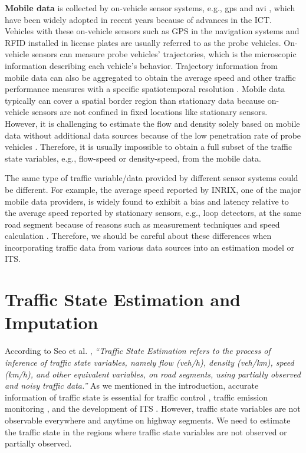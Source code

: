 \documentclass[english]{kththesis}
\begin{document}
\textbf{Mobile data} is collected by on-vehicle sensor systems, e.g., \gls{gps} and \gls{avi} \cite{seo_tse, tsanakas_emission_estimation, herrera_gps_mobile_century}, which have been widely adopted in recent years because of advances in the ICT. Vehicles with these on-vehicle sensors such as GPS in the navigation systems and RFID installed in license plates are usually referred to as the probe vehicles. On-vehicle sensors can measure probe vehicles' trajectories, which is the microscopic information describing each vehicle's behavior. Trajectory information from mobile data can also be aggregated to obtain the average speed and other traffic performance measures with a specific spatiotemporal resolution \cite{seo_tse, sharma_inrix_data_opportunity}. Mobile data typically can cover a spatial border region than stationary data because on-vehicle sensors are not confined in fixed locations like stationary sensors. However, it is challenging to estimate the flow and density solely based on mobile data without additional data sources because of the low penetration rate of probe vehicles \cite{tsanakas_emission_estimation}. Therefore, it is usually impossible to obtain a full subset of the traffic state variables, e.g., flow-speed or density-speed, from the mobile data. 

The same type of traffic variable/data provided by different sensor systems could be different. For example, the average speed reported by INRIX, one of the major mobile data providers, is widely found to exhibit a bias and latency relative to the average speed reported by stationary sensors, e.g., loop detectors, at the same road segment because of reasons such as measurement techniques and speed calculation \cite{sharma_inrix_data_opportunity, kim_inrix_data_comparing}. Therefore, we should be careful about these differences when incorporating traffic data from various data sources into an estimation model or ITS.

\section{Traffic State Estimation and Imputation}
\label{sec:tse}
According to Seo et al. \cite{seo_tse}, \textit{“Traffic State Estimation refers to the process of inference of traffic state variables, namely flow (veh/h), density (veh/km), speed (km/h), and other equivalent variables, on road segments, using partially observed and noisy traffic data.”} As we mentioned in the introduction, accurate information of traffic state is essential for traffic control \cite{seo_tse}, traffic emission monitoring \cite{tsanakas_emission_estimation}, and the development of ITS \cite{seo_tse_xfcd}. However, traffic state variables are not observable everywhere and anytime on highway segments. We need to estimate the traffic state in the regions where traffic state variables are not observed or partially observed. 
\end{document}
